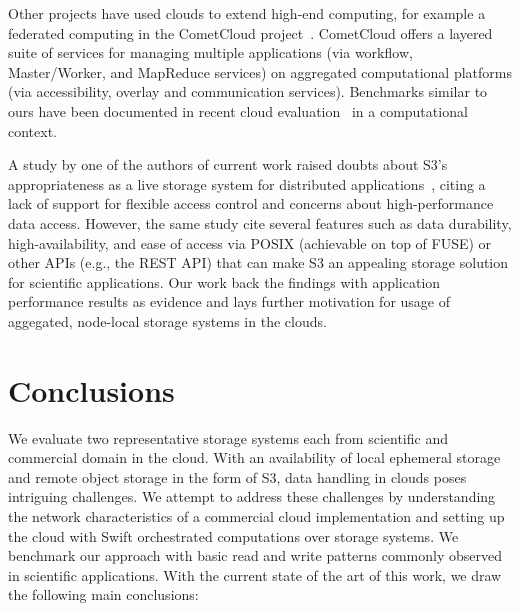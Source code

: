 \documentclass{sig-alternate}
\begin{document}
Other projects have used clouds to extend high-end computing, for example a
federated computing in the CometCloud project~\cite{cometcloud_web}. CometCloud
offers a layered suite of services for managing multiple applications (via
workflow, Master/Worker, and MapReduce services) on aggregated computational
platforms (via accessibility, overlay and communication services).  Benchmarks
similar to ours have been documented in recent cloud
evaluation~\cite{cloudefficacy} in a computational context.

A study by one of the authors of current work raised doubts about S3's
appropriateness as a live storage system for distributed
applications~\cite{s3-viable}, citing a lack of support for flexible access
control and concerns about high-performance data access. However, the same
study cite several features such as data durability, high-availability, and
ease of access via POSIX (achievable on top of FUSE) or other APIs (e.g., the
REST API) that can make S3 an appealing storage solution for scientific
applications. Our work back the findings with application performance results
as evidence and lays further motivation for usage of aggegated, node-local
storage systems in the clouds.


\section{Conclusions}\label{sec:concl}
We evaluate two representative storage systems each from scientific and
commercial domain in the cloud. With an availability of local ephemeral storage
and remote object storage in the form of S3, data handling in clouds poses
intriguing challenges.  We attempt to address these challenges by understanding
the network characteristics of a commercial cloud implementation and setting up
the cloud with Swift orchestrated computations over storage systems. We
benchmark our approach with basic read and write patterns commonly observed in
scientific applications. With the current state of the art of this work, we
draw the following main conclusions:
\end{document}
